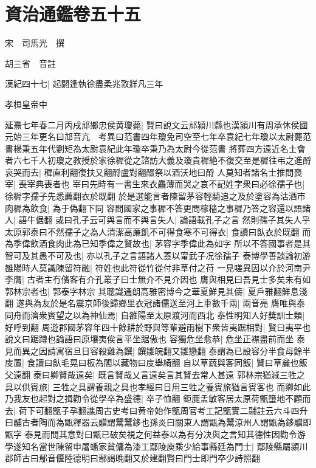 \chapter{資治通鑑卷五十五}
宋　司馬光　撰

胡三省　音註

漢紀四十七|{
	起閼逢執徐盡柔兆敦牂凡三年}


孝桓皇帝中

延熹七年春二月丙戌邟鄉忠侯黄瓊薨|{
	賢曰說文云邟潁川縣也漢潁川有周承休侯國元始三年更名曰邟音亢　考異曰范書四年瓊免司空至七年卒袁紀七年瓊以太尉薨范書楊秉五年代劉矩為太尉袁紀此年瓊卒秉乃為太尉今從范書}
將葬四方遠近名士會者六七千人初瓊之教授於家徐穉從之諮訪大義及瓊貴穉絶不復交至是穉往弔之進酹哀哭而去|{
	穉直利翻復扶又翻酹盧對翻醊祭以酒沃地曰酹}
人莫知者諸名士推問喪宰|{
	喪宰典喪者也}
宰曰先時有一書生來衣麤薄而哭之哀不記姓字衆曰必徐孺子也|{
	徐穉字孺子先悉薦翻衣於既翻}
於是選能言者陳留茅容輕騎追之及於塗容為沽酒市肉穉為飲食|{
	為于偽翻下同}
容問國家之事穉不答更問稼穡之事穉乃答之容還以語諸人|{
	語牛倨翻}
或曰孔子云可與言而不與言失人|{
	論語載孔子之言}
然則孺子其失人乎太原郭泰曰不然孺子之為人清潔高亷飢不可得食寒不可得衣|{
	食讀曰飤衣於既翻}
而為季偉飲酒食肉此為已知季偉之賢故也|{
	茅容字季偉此為如字}
所以不答國事者是其智可及其愚不可及也|{
	亦以孔子之言語諸人蓋以甯武子况徐孺子}
泰博學善談論初游雒陽時人莫識陳留符融|{
	符姓也此符從竹從付非草付之苻}
一見嗟異因以介於河南尹李膺|{
	古者主冇儐客有介孔叢子曰士無介不見介因也}
膺與相見曰吾見士多矣未有如郭林宗者也|{
	郭泰字林宗}
其聰識通朗高雅密博今之華夏鮮見其儔|{
	夏戶雅翻鮮息淺翻}
遂與為友於是名震京師後歸鄉里衣冠諸儒送至河上車數千兩|{
	兩音亮}
膺唯與泰同舟而濟衆賓望之以為神仙焉|{
	自雒陽至太原渡河而西北}
泰性明知人好奬訓士類|{
	好呼到翻}
周遊郡國茅容年四十餘耕於野與等輩避雨樹下衆皆夷踞相對|{
	賢曰夷平也說文曰踞蹲也論語曰原壤夷俟言平坐踞傲也}
容獨危坐愈恭|{
	危坐正襟盡前而坐}
泰見而異之因請寓宿旦日容殺雞為饌|{
	饌雛皖翻又雛戀翻}
泰謂為已設容分半食母餘半庋置|{
	食讀曰飤毛晃曰板為閣以藏物曰庋舉綺翻}
自以草蔬與客同飯|{
	賢曰草麄也飯父遠翻}
泰曰卿賢哉遠矣|{
	既言賢哉乂言遠矣言其賢去常人甚遠}
郭林宗猶減三牲之具以供賓旅|{
	三牲之具謂養親之具也孝經曰日用三牲之養賓旅猶言賓客也}
而卿如此乃我友也起對之揖勸令從學卒為盛德|{
	卒子恤翻}
鉅鹿孟敏客居太原荷甑墮地不顧而去|{
	荷下可翻甑子孕翻譙周古史考曰黄帝始作甑周官考工記甑實二鬴註云六斗四升曰鬴古者陶而為甑釋器云䰝謂鬵鬵鉹也孫炎曰關東人謂甑為鬵涼州人謂甑為鉹䰝即甑字}
泰見而問其意對曰甑已破矣視之何益泰以為有分决與之言知其德性因勸令游學遂知名當世陳留申屠蟠家貧傭為漆工鄢陵庾乘少給事縣廷為門士|{
	鄢陵縣屬潁川郡師古曰鄢音偃陸德明曰鄢謁晩翻又於建翻賢曰門士即門卒少詩照翻}
